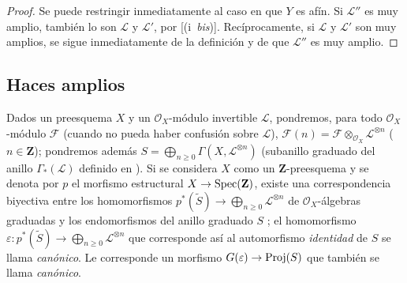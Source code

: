 \documentclass[oneside,10pt]{amsart}
\makeatletter
\renewcommand{\geq}{\geqslant}
\newcommand{\ega@arrow}[2]{\mathchoice{#1}{#2}{#2}{#2}}
\renewcommand{\to}{\ega@arrow{\longrightarrow}{\rightarrow}}
\let\EGAOriginalLabel\label
\renewcommand{\label}[1]{\phantomsection\EGAOriginalLabel{#1}}
\makeatother
\begin{document}
\begin{proof}
Se puede restringir inmediatamente al caso en que $Y$ es afín.
Si $\mathcal{L}''$ es muy amplio, también lo son $\mathcal{L}$ y $\mathcal{L}'$, por [(i~\emph{bis})].
Recíprocamente, si $\mathcal{L}$ y $\mathcal{L}'$ son muy amplios, se sigue inmediatamente de la definición  y de  que $\mathcal{L}''$ es muy amplio.
\end{proof}

\subsection{Haces amplios}
\label{subsection:II.4.5-fr}

\begin{env}[4.5.1]
\label{II.4.5.1-fr}
Dados un preesquema $X$ y un $\mathcal{O}_X$-módulo invertible $\mathcal{L}$, pondremos, para todo $\mathcal{O}_X$-módulo $\mathcal{F}$ (cuando no pueda haber confusión sobre $\mathcal{L}$), $\mathcal{F}(n)=\mathcal{F}\otimes_{\mathcal{O}_X}\mathcal{L}^{\otimes n}$ ($n\in\mathbf{Z}$);
pondremos además $S=\bigoplus_{n\geq0}\Gamma(X,\mathcal{L}^{\otimes n})$ (subanillo graduado del anillo $\Gamma_*(\mathcal{L})$ definido en ).
Si se considera $X$ como un $\mathbf{Z}$-preesquema y se denota por $p$ el morfismo estructural $X\to\operatorname{Spec}(\mathbf{Z})$, existe una correspondencia biyectiva entre los homomorfismos $p^*(\widetilde{S})\longrightarrow\bigoplus_{n\geq0}\mathcal{L}^{\otimes n}$ de $\mathcal{O}_X$-álgebras graduadas y los endomorfismos del anillo graduado $S$ ;
el homomorfismo $\varepsilon:p^*(\widetilde{S})\longrightarrow\bigoplus_{n\geq0}\mathcal{L}^{\otimes n}$ que corresponde así al automorfismo \emph{identidad} de $S$ se llama \emph{canónico}.
Le corresponde  un morfismo $G(\varepsilon)\to\operatorname{Proj}(S)$ que también se llama \emph{canónico}.
\end{env}
\end{document}
